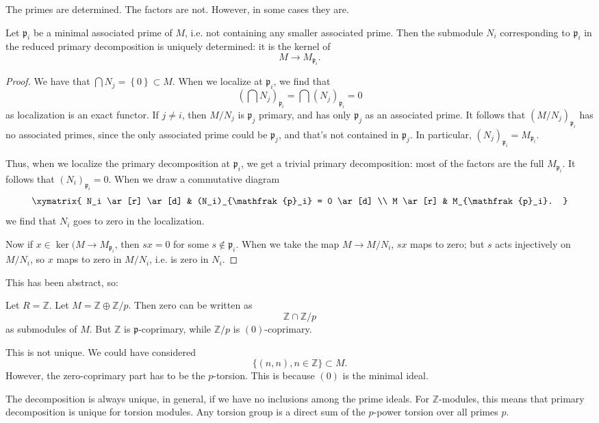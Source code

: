 The primes are determined. The factors are not. However, in some cases they are.

\begin{proposition} 
Let $\mathfrak{p}_i$ be a minimal associated prime of $M$, i.e. not containing
any smaller associated prime. Then the submodule $N_i$  corresponding to
$\mathfrak{p}_i$ in the reduced primary decomposition is uniquely determined:
it is the kernel of 
\[ M \to M_{\mathfrak{p}_i}.  \]
\end{proposition} 

\begin{proof} 
We have that $\bigcap N_j = \left\{0\right\} \subset M$. When we localize at
$\mathfrak{p}_i$, we find that
\[ (\bigcap N_j)_{\mathfrak{p}_i} = \bigcap (N_j)_{\mathfrak{p}_i} =0 \]
as localization is an exact functor. If $j \neq i$, then $M/N_j$ is
$\mathfrak{p}_j$ primary, and has only $\mathfrak{p}_j$ as an associated prime.
It follows that $(M/N_j)_{\mathfrak{p}_i}$ has no associated primes, since the
only associated prime could be $\mathfrak{p}_j$, and that's not contained in
$\mathfrak{p}_j$.
In particular, $(N_j)_{\mathfrak{p}_i} = M_{\mathfrak{p}_i}$.

Thus, when we localize the primary decomposition at $\mathfrak{p}_i$, we get
a trivial primary decomposition: most of the factors are the full
$M_{\mathfrak{p}_i}$.  It follows that $(N_i)_{\mathfrak{p}_i}=0$. When we draw
a commutative diagram
\[ 
\xymatrix{
N_i \ar[r] \ar[d]  &  (N_i)_{\mathfrak{p}_i} = 0 \ar[d]  \\
M \ar[r] &  M_{\mathfrak{p}_i}.
}
\]
we find that $N_i$ goes to zero in the localization.

Now if $x \in \ker(M \to M_{\mathfrak{p}_i}$, then $sx = 0$ for some $s \notin
\mathfrak{p}_i$. When we take the map $M \to M/N_i$, $sx$ maps to zero; but $s$
acts injectively on $M/N_i$, so $x$ maps to zero in $M/N_i$, i.e. is zero in
$N_i$.
\end{proof} 

This has been abstract, so:
\begin{example} Let $ R = \mathbb{Z}$.
Let $M = \mathbb{Z} \oplus \mathbb{Z}/p$. Then zero can be written as 
\[ \mathbb{Z} \cap \mathbb{Z}/p  \]
as submodules of $M$. But $\mathbb{Z}$ is $\mathfrak{p}$-coprimary, while
$\mathbb{Z}/p$ is $(0)$-coprimary. 

This is not unique. We could have considered 
\[ \{(n,n), n \in \mathbb{Z}\} \subset M.  \]
However, the zero-coprimary part has to be the $p$-torsion. This is because
$(0)$ is the minimal ideal. 

The decomposition is always unique, in general, if
we have no inclusions among the prime ideals. For $\mathbb{Z}$-modules, this
means that primary decomposition is unique for torsion modules. 
Any torsion group is a direct sum of the $p$-power torsion over all primes $p$. 
\end{example} 


